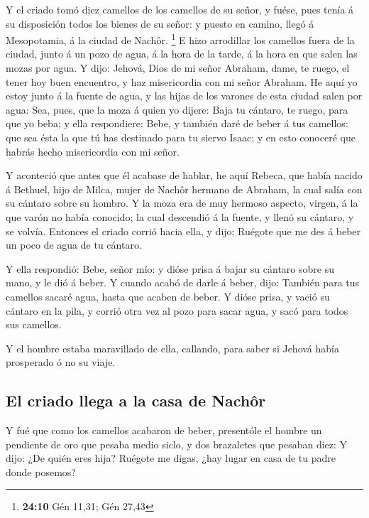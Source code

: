  Y el criado tomó diez camellos de los camellos de su
señor, y fuése, pues tenía á su disposición todos los bienes de su
señor: y puesto en camino, llegó á Mesopotamia, á la ciudad de Nachôr.
\footnote{\textbf{24:10} Gén 11,31; Gén 27,43}  E hizo
arrodillar los camellos fuera de la ciudad, junto á un pozo de agua, á
la hora de la tarde, á la hora en que salen las mozas por agua.
 Y dijo: Jehová, Dios de mi señor Abraham, dame, te ruego,
el tener hoy buen encuentro, y haz misericordia con mi señor Abraham.
 He aquí yo estoy junto á la fuente de agua, y las hijas de
los varones de esta ciudad salen por agua:  Sea, pues, que
la moza á quien yo dijere: Baja tu cántaro, te ruego, para que yo beba;
y ella respondiere: Bebe, y también daré de beber á tus camellos: que
sea ésta la que tú has destinado para tu siervo Isaac; y en esto
conoceré que habrás hecho misericordia con mi señor.

 Y aconteció que antes que él acabase de hablar, he aquí
Rebeca, que había nacido á Bethuel, hijo de Milca, mujer de Nachôr
hermano de Abraham, la cual salía con su cántaro sobre su hombro.
 Y la moza era de muy hermoso aspecto, virgen, á la que
varón no había conocido; la cual descendió á la fuente, y llenó su
cántaro, y se volvía.  Entonces el criado corrió hacia
ella, y dijo: Ruégote que me des á beber un poco de agua de tu cántaro.

 Y ella respondió: Bebe, señor mío: y dióse prisa á bajar
su cántaro sobre su mano, y le dió á beber.  Y cuando acabó
de darle á beber, dijo: También para tus camellos sacaré agua, hasta que
acaben de beber.  Y dióse prisa, y vació su cántaro en la
pila, y corrió otra vez al pozo para sacar agua, y sacó para todos sus
camellos.

 Y el hombre estaba maravillado de ella, callando, para
saber si Jehová había prosperado ó no su viaje.

\hypertarget{el-criado-llega-a-la-casa-de-nachuxf4r}{%
\subsection{El criado llega a la casa de
Nachôr}\label{el-criado-llega-a-la-casa-de-nachuxf4r}}

 Y fué que como los camellos acabaron de beber, presentóle
el hombre un pendiente de oro que pesaba medio siclo, y dos brazaletes
que pesaban diez:  Y dijo: ¿De quién eres hija? Ruégote me
digas, ¿hay lugar en casa de tu padre donde posemos?

